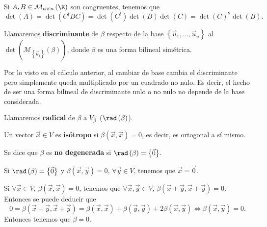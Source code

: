 Si $\displaystyle A,B \in \mathcal{M}_{ n \times n }\left(\K\right) $ son congruentes, tenemos que 
\[ \det\left(A\right) =\det\left(C^{t}BC\right) = \det\left(C^{t}\right)\det\left(B\right)\det\left(C\right) = \det\left(C\right)^{2}\det\left(B\right) .\]
\begin{fdefinition}[Discriminante]
	\normalfont Llamaremos \textbf{discriminante} de $\displaystyle \beta  $ respecto de la base $\displaystyle \left\{ \vec{u}_{1}, \ldots , \vec{u}_{n}\right\}  $ al $\displaystyle \det\left(\mathcal{M}_{ \left\{ \vec{u}_{i}\right\} }\left(\beta\right)\right) $, donde $\displaystyle \beta  $ es una forma bilineal simétrica.
\end{fdefinition}
\begin{observation}
\normalfont Por lo visto en el cálculo anterior, al cambiar de base cambia el discriminante pero simplemente queda multiplicado por un cuadrado no nulo. Es decir, el hecho de ser una forma bilineal de discriminante nulo o no nulo no depende de la base considerada. 
\end{observation}
\begin{fdefinition}[Radical]
\normalfont Llamaremos \textbf{radical} de $\displaystyle \beta  $ a $\displaystyle V^{\perp }_{\beta } $ ($\displaystyle \rad\left(\beta\right) $).
\end{fdefinition}
\begin{fdefinition}[Isótropo]
\normalfont Un vector $\displaystyle \vec{x} \in V $ es \textbf{isótropo} si $\displaystyle \beta\left(\vec{x}, \vec{x}\right) = 0 $, es decir, es ortogonal a sí mismo.
\end{fdefinition}
\begin{fdefinition}[]
	\normalfont Se dice que $\displaystyle \beta  $ es \textbf{no degenerada} si $\displaystyle \rad\left(\beta \right) = \left\{ \vec{0}\right\}  $.
\end{fdefinition}
\begin{observation}
\normalfont Si $\displaystyle \rad\left(\beta \right) = \left\{ \vec{0}\right\}  $ y $\displaystyle \beta\left(\vec{x}, \vec{y}\right) = 0 $, $\displaystyle \forall \vec{y} \in V $, tenemos que $\displaystyle \vec{x} = \vec{0} $.
\end{observation}
\begin{observation}
\normalfont Si $\displaystyle \forall \vec{x} \in V $, $\displaystyle \beta\left(\vec{x}, \vec{x}\right)=0 $, tenemos que $\displaystyle \forall \vec{x}, \vec{y} \in V $, $\displaystyle \beta\left(\vec{x} + \vec{y}, \vec{x} + \vec{y}\right) =0$. Entonces se puede deducir que
\[ 0 = \beta\left(\vec{x} + \vec{y}, \vec{x} + \vec{y}\right) = \beta\left(\vec{x}, \vec{x}\right) + \beta\left(\vec{y} , \vec{y}\right) + 2 \beta\left(\vec{x}, \vec{y}\right) \iff \beta\left(\vec{x}, \vec{y}\right) = 0 .\]
Entonces tenemos que $\displaystyle \beta = 0 $.
\end{observation}
